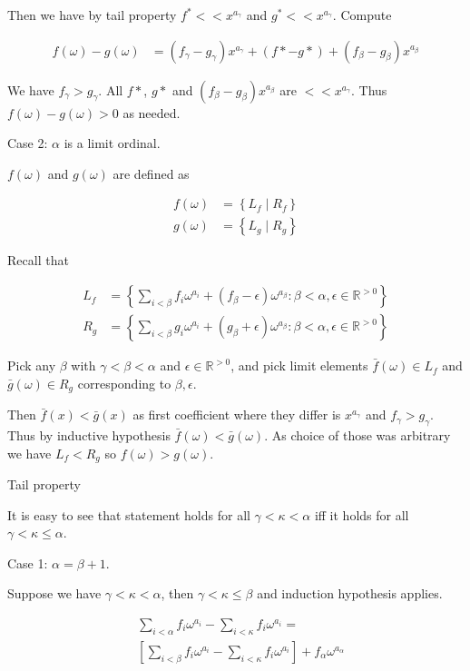 \documentclass{article}
\newcommand{\brac}[1]{\left[ #1 \right]}
\newcommand{\curly}[1]{\left\{ #1 \right\}}
\newcommand{\R}{\mathbb{R}}
\newcommand{\w}{\omega}
\begin{document}
Then we have by tail property $f^* << x^{a_\gamma}$ and $g^* << x^{a_\gamma}$. Compute

\begin{align*}
  f(\w) - g(\w) &= (f_\gamma - g_\gamma) x^{a_\gamma} + (f* - g*) + (f_\beta - g_\beta) x^{a_\beta}
\end{align*}

We have $f_\gamma > g_\gamma$.
All $f*$, $g*$ and $(f_\beta - g_\beta) x^{a_\beta}$ are  $<< x^{a_\gamma}$.
Thus $f(\w) - g(\w) > 0$ as needed.

Case 2: $\alpha$ is a limit ordinal.

$f(\w)$ and $g(\w)$ are defined as 

\begin{align*}
  f(\w) &= \curly{L_f \mid R_f} \\
  g(\w) &= \curly{L_g \mid R_g}
\end{align*}

Recall that

\begin{align*}
  L_f &= \curly{\sum_{i < \beta} f_i \w^{a_i} + (f_\beta - \epsilon) \w^{a_\beta}
	\colon \beta < \alpha, \epsilon \in \R^{>0}} \\
  R_g &= \curly{\sum_{i < \beta} g_i \w^{a_i} + (g_\beta + \epsilon) \w^{a_\beta}
	\colon \beta < \alpha, \epsilon \in \R^{>0}}
\end{align*}

Pick any $\beta$ with $\gamma < \beta < \alpha$ and $\epsilon \in \R^{>0}$,
and pick limit elements $\bar f(\w) \in L_f$ and $\bar g(\w) \in R_g$ corresponding to $\beta, \epsilon$.

Then $\bar f(x) < \bar g(x)$ as first coefficient where they differ is $x^{a_\gamma}$ and $f_\gamma > g_\gamma$.
Thus by inductive hypothesis $\bar f(\w) < \bar g(\w)$.
As choice of those was arbitrary we have $L_f < R_g$ so $f(\w) > g(\w)$.

Tail property

It is easy to see that statement holds for all $\gamma < \kappa < \alpha$ iff it holds for all $\gamma < \kappa \leq \alpha$.

Case 1: $\alpha = \beta + 1$.

Suppose we have $\gamma < \kappa < \alpha$, then $\gamma < \kappa \leq \beta$ and induction hypothesis applies.

\begin{align*}
	&\sum_{i < \alpha} f_i \w^{a_i} - \sum_{i < \kappa} f_i \w^{a_i} = \\
	&\brac{\sum_{i < \beta} f_i \w^{a_i} - \sum_{i < \kappa} f_i \w^{a_i}} + f_\alpha \w^{a_\alpha}
\end{align*}
\end{document}
